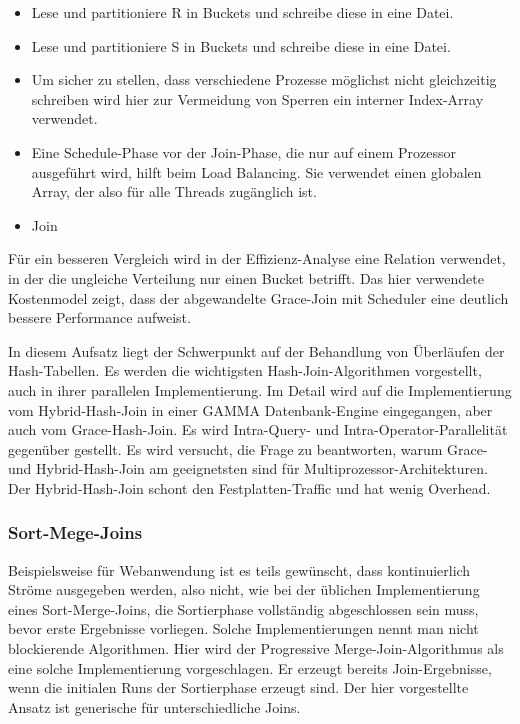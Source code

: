 \documentclass[a4paper,12pt,twoside]{article}
\begin{document}
\begin{itemize}
	\item Lese und partitioniere R in Buckets und schreibe diese in eine Datei.
	\item Lese und partitioniere S in Buckets und schreibe diese in eine Datei.
	\item Um sicher zu stellen, dass verschiedene Prozesse möglichst nicht gleichzeitig schreiben wird hier zur Vermeidung von Sperren ein interner Index-Array verwendet.
	\item Eine Schedule-Phase vor der Join-Phase, die nur auf einem Prozessor ausgeführt wird, hilft beim Load Balancing. Sie verwendet einen globalen Array, der also für alle Threads zugänglich ist.
	\item Join
\end{itemize}

Für ein besseren Vergleich wird in der Effizienz-Analyse eine Relation verwendet, in der die ungleiche Verteilung nur einen Bucket betrifft. Das hier verwendete Kostenmodel zeigt, dass der abgewandelte Grace-Join mit Scheduler eine deutlich bessere Performance aufweist. 

\textbf{}

In diesem Aufsatz liegt der Schwerpunkt auf der Behandlung von Überläufen der Hash-Tabellen. Es werden die wichtigsten Hash-Join-Algorithmen vorgestellt, auch in ihrer parallelen Implementierung. Im Detail wird auf die Implementierung vom Hybrid-Hash-Join in einer GAMMA Datenbank-Engine eingegangen, aber auch vom Grace-Hash-Join. Es wird Intra-Query- und Intra-Operator-Parallelität gegenüber gestellt. Es wird versucht, die Frage zu beantworten, warum Grace- und Hybrid-Hash-Join am geeignetsten sind für Multiprozessor-Architekturen. Der Hybrid-Hash-Join schont den Festplatten-Traffic und hat wenig Overhead. 

\subsubsection{Sort-Mege-Joins}

\textbf{}

Beispielsweise für Webanwendung ist es teils gewünscht, dass kontinuierlich Ströme ausgegeben werden, also nicht, wie bei der üblichen Implementierung eines Sort-Merge-Joins, die Sortierphase vollständig abgeschlossen sein muss, bevor erste Ergebnisse vorliegen. Solche Implementierungen nennt man nicht blockierende Algorithmen. Hier wird der Progressive Merge-Join-Algorithmus als eine solche Implementierung vorgeschlagen. Er erzeugt bereits Join-Ergebnisse, wenn die initialen Runs der Sortierphase erzeugt sind. Der hier vorgestellte Ansatz ist generische für unterschiedliche Joins.
\end{document}
